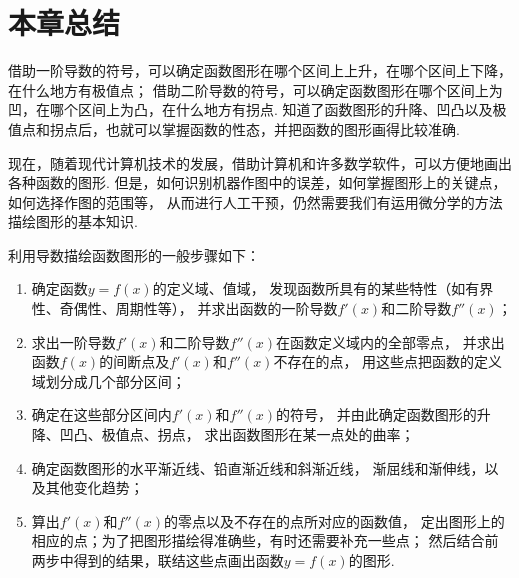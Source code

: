 \section{本章总结}
借助一阶导数的符号，可以确定函数图形在哪个区间上上升，在哪个区间上下降，在什么地方有极值点；
借助二阶导数的符号，可以确定函数图形在哪个区间上为凹，在哪个区间上为凸，在什么地方有拐点.
知道了函数图形的升降、凹凸以及极值点和拐点后，也就可以掌握函数的性态，并把函数的图形画得比较准确.

现在，随着现代计算机技术的发展，借助计算机和许多数学软件，可以方便地画出各种函数的图形.
但是，如何识别机器作图中的误差，如何掌握图形上的关键点，如何选择作图的范围等，
从而进行人工干预，仍然需要我们有运用微分学的方法描绘图形的基本知识.

利用导数描绘函数图形的一般步骤如下：\begin{enumerate}
	\item 确定函数\(y=f(x)\)的定义域、值域，
	发现函数所具有的某些特性（如有界性、奇偶性、周期性等），
	并求出函数的一阶导数\(f'(x)\)和二阶导数\(f''(x)\)；

	\item 求出一阶导数\(f'(x)\)和二阶导数\(f''(x)\)在函数定义域内的全部零点，
	并求出函数\(f(x)\)的间断点及\(f'(x)\)和\(f''(x)\)不存在的点，
	用这些点把函数的定义域划分成几个部分区间；

	\item 确定在这些部分区间内\(f'(x)\)和\(f''(x)\)的符号，
	并由此确定函数图形的升降、凹凸、极值点、拐点，
	求出函数图形在某一点处的曲率；

	\item 确定函数图形的水平渐近线、铅直渐近线和斜渐近线，
	渐屈线和渐伸线，以及其他变化趋势；

	\item 算出\(f'(x)\)和\(f''(x)\)的零点以及不存在的点所对应的函数值，
	定出图形上的相应的点；为了把图形描绘得准确些，有时还需要补充一些点；
	然后结合前两步中得到的结果，联结这些点画出函数\(y=f(x)\)的图形.
\end{enumerate}
